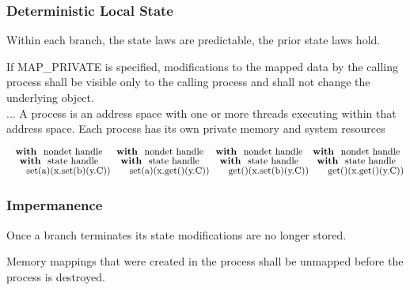 \documentclass[logo,bsc,singlespacing,parskip]{infthesis}
\begin{document}
\subsubsection{Deterministic Local State}
Within each branch, the state laws are predictable, the prior state laws hold.



\begin{tcolorbox}[colback=gray!10, colframe=gray!60, sharp corners, boxrule=0.5pt, title={POSIX Base Specifications, Issue 7, p.1339}]
If MAP\_PRIVATE is specified, modifications to the mapped data by the calling process shall be visible only to the 
calling process and shall not change the underlying object.
 \\ ...
A process is an address space with one or more threads executing within that address space. Each process has its own private memory and system resources
 \end{tcolorbox}




\vspace{-0.0em}
\[
\begin{array}{@{}l@{}l@{}l@{}l@{}}
\shortstack{
  \textbf{with } \text{nondet handle} \\
  \textbf{with } \text{state handle} \\
  \quad\quad\text{set(a)(x.set(b)(y.C))}
}
&
\shortstack{
  \textbf{with } \text{nondet handle} \\
  \textbf{with } \text{state handle} \\
  \quad\quad\text{set(a)(x.get()(y.C))}
}
&
\shortstack{
  \textbf{with } \text{nondet handle} \\
  \textbf{with } \text{state handle} \\
  \quad\quad\text{get()(x.set(b)(y.C))}
}
&
\shortstack{
  \textbf{with } \text{nondet handle} \\
  \textbf{with } \text{state handle} \\
  \quad\quad\text{get()(x.get()(y.C))}
}
\end{array}
\]

    \subsubsection{Impermanence} 
    Once a branch terminates its state modifications are no longer stored.



\begin{tcolorbox}[colback=gray!10, colframe=gray!60, sharp corners, boxrule=0.5pt, title={POSIX Base Specifications, Issue 7, p.554}]
Memory mappings that were created in the process shall be unmapped before the process
 is destroyed.
 \end{tcolorbox}
 
\end{document}
